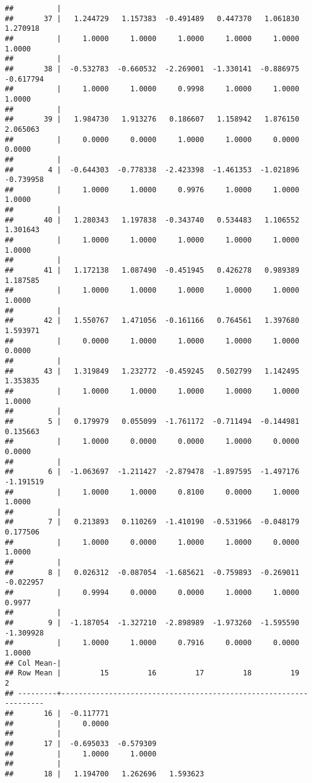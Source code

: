 \documentclass[12pt,]{article}
\begin{document}
\begin{verbatim}
##          |
##       37 |   1.244729   1.157383  -0.491489   0.447370   1.061830   1.270918
##          |     1.0000     1.0000     1.0000     1.0000     1.0000     1.0000
##          |
##       38 |  -0.532783  -0.660532  -2.269001  -1.330141  -0.886975  -0.617794
##          |     1.0000     1.0000     0.9998     1.0000     1.0000     1.0000
##          |
##       39 |   1.984730   1.913276   0.186607   1.158942   1.876150   2.065063
##          |     0.0000     0.0000     1.0000     1.0000     0.0000     0.0000
##          |
##        4 |  -0.644303  -0.778338  -2.423398  -1.461353  -1.021896  -0.739958
##          |     1.0000     1.0000     0.9976     1.0000     1.0000     1.0000
##          |
##       40 |   1.280343   1.197838  -0.343740   0.534483   1.106552   1.301643
##          |     1.0000     1.0000     1.0000     1.0000     1.0000     1.0000
##          |
##       41 |   1.172138   1.087490  -0.451945   0.426278   0.989389   1.187585
##          |     1.0000     1.0000     1.0000     1.0000     1.0000     1.0000
##          |
##       42 |   1.550767   1.471056  -0.161166   0.764561   1.397680   1.593971
##          |     0.0000     1.0000     1.0000     1.0000     1.0000     0.0000
##          |
##       43 |   1.319849   1.232772  -0.459245   0.502799   1.142495   1.353835
##          |     1.0000     1.0000     1.0000     1.0000     1.0000     1.0000
##          |
##        5 |   0.179979   0.055099  -1.761172  -0.711494  -0.144981   0.135663
##          |     1.0000     0.0000     0.0000     1.0000     0.0000     0.0000
##          |
##        6 |  -1.063697  -1.211427  -2.879478  -1.897595  -1.497176  -1.191519
##          |     1.0000     1.0000     0.8100     0.0000     1.0000     1.0000
##          |
##        7 |   0.213893   0.110269  -1.410190  -0.531966  -0.048179   0.177506
##          |     1.0000     0.0000     1.0000     1.0000     0.0000     1.0000
##          |
##        8 |   0.026312  -0.087054  -1.685621  -0.759893  -0.269011  -0.022957
##          |     0.9994     0.0000     0.0000     1.0000     1.0000     0.9977
##          |
##        9 |  -1.187054  -1.327210  -2.898989  -1.973260  -1.595590  -1.309928
##          |     1.0000     1.0000     0.7916     0.0000     0.0000     1.0000
## Col Mean-|
## Row Mean |         15         16         17         18         19          2
## ---------+------------------------------------------------------------------
##       16 |  -0.117771
##          |     0.0000
##          |
##       17 |  -0.695033  -0.579309
##          |     1.0000     1.0000
##          |
##       18 |   1.194700   1.262696   1.593623

\end{verbatim}
\end{document}
